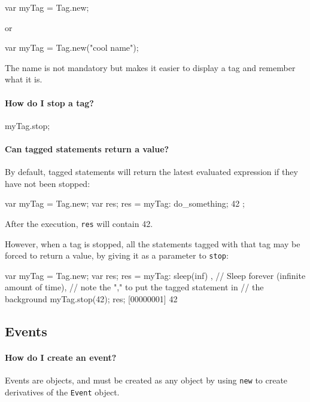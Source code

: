 \begin{urbifixme}
var myTag = Tag.new;
\end{urbifixme}

or

\begin{urbifixme}
var myTag = Tag.new("cool name");
\end{urbifixme}

The name is not mandatory but makes it easier to display a tag and remember
what it is.

\paragraph{How do I stop a tag?}
\begin{urbifixme}
myTag.stop;
\end{urbifixme}

\paragraph{Can tagged statements return a value?}
By default, tagged statements will return the latest evaluated expression if
they have not been stopped:

\begin{urbifixme}
var myTag = Tag.new;
var res;
res = { myTag: { do_something; 42 } };
\end{urbifixme}

After the execution, \lstinline{res} will contain 42.

However, when a tag is stopped, all the statements tagged with that
tag may be forced to return a value, by giving it as a parameter to
\lstinline{stop}:

\begin{urbifixme}
var myTag = Tag.new;
var res;
{ res = { myTag: sleep(inf) } }, // Sleep forever (infinite amount of time),
                                 // note the "," to put the tagged statement in
                                 // the background
myTag.stop(42);
res;
[00000001] 42
\end{urbifixme}

\subsection{Events}
\paragraph{How do I create an event?}
Events are objects, and must be created as any object by using
\lstinline{new} to create derivatives of the \lstinline{Event} object.


